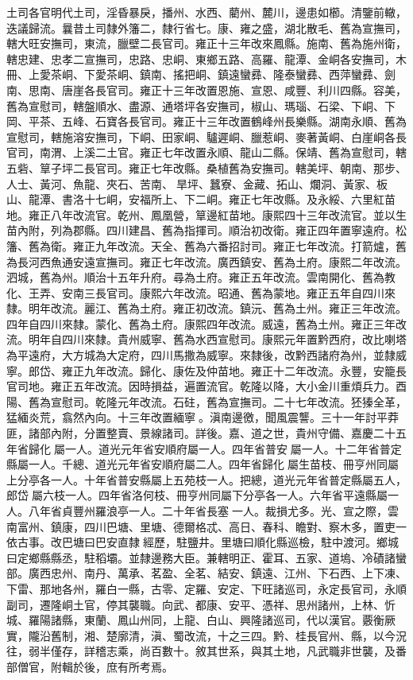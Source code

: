 \begin{pinyinscope}
土司各官明代土司，淫昏暴戾，播州、水西、藺州、麓川，邊患如櫛。清鑒前轍，迭議歸流。曩昔土司隸外籓二，隸行省七。康、雍之盛，湖北散毛、舊為宣撫司，轄大旺安撫司，東流，臘壁二長官司。雍正十三年改來鳳縣。施南、舊為施州衛，轄忠建、忠孝二宣撫司，忠路、忠峒、東鄉五路、高羅、龍潭、金峒各安撫司，木冊、上愛茶峒、下愛茶峒、鎮南、搖把峒、鎮遠蠻彞、隆泰蠻彞、西萍蠻彞、劍南、思南、唐崖各長官司。雍正十三年改置恩施、宣恩、咸豐、利川四縣。容美，舊為宣慰司，轄盤順水、盡源、通塔坪各安撫司，椒山、瑪瑙、石梁、下峒、下岡、平茶、五峰、石寶各長官司。雍正十三年改置鶴峰州長樂縣。湖南永順、舊為宣慰司，轄施溶安撫司，下峒、田家峒、驢遲峒、臘惹峒、麥著黃峒、白崖峒各長官司，南渭、上溪二土官。雍正七年改置永順、龍山二縣。保靖、舊為宣慰司，轄五砦、筸子坪二長官司。雍正七年改縣。桑植舊為安撫司。轄美坪、朝南、那步、人士、黃河、魚龍、夾石、苦南、旱坪、蠶寮、金藏、拓山、爛洞、黃家、板山、龍潭、書洛十七峒，安福所上、下二峒。雍正七年改縣。及永綏、六里紅苗地。雍正八年改流官。乾州、鳳凰營，筸邊紅苗地。康熙四十三年改流官。並以生苗內附，列為郡縣。四川建昌、舊為指揮司。順治初改衛。雍正四年置寧遠府。松籓、舊為衛。雍正九年改流。天全、舊為六番招討司。雍正七年改流。打箭爐，舊為長河西魚通安遠宣撫司。雍正七年改流。廣西鎮安、舊為土府。康熙二年改流。泗城，舊為州。順治十五年升府。尋為土府。雍正五年改流。雲南開化、舊為教化、王弄、安南三長官司。康熙六年改流。昭通、舊為蒙地。雍正五年自四川來隸。明年改流。麗江、舊為土府。雍正初改流。鎮沅、舊為土州。雍正三年改流。四年自四川來隸。蒙化、舊為土府。康熙四年改流。威遠，舊為土州。雍正三年改流。明年自四川來隸。貴州威寧、舊為水西宣慰司。康熙元年置黔西府，改比喇塔為平遠府，大方城為大定府，四川馬撒為威寧。來隸後，改黔西諸府為州，並隸威寧。郎岱、雍正九年改流。歸化、康佐及仲苗地。雍正十二年改流。永豐，安籠長官司地。雍正五年改流。因時損益，遍置流官。乾隆以降，大小金川重煩兵力。酉陽、舊為宣慰司。乾隆元年改流。石砫，舊為宣撫司。二十七年改流。狉獉全革，猛緬炎荒，翕然內向。十三年改置緬寧。滇南邊徼，聞風震讋。三十一年討平莽匪，諸部內附，分置整賣、景線諸司。詳後。嘉、道之世，貴州守備、嘉慶二十五年省歸化屬一人。道光元年省安順府屬一人。四年省普安屬一人。十二年省普定縣屬一人。千總、道光元年省安順府屬二人。四年省歸化屬生苗枝、冊亨州同屬上分亭各一人。十年省普安縣屬上五苑枝一人。把總，道光元年省普定縣屬五人，郎岱屬六枝一人。四年省洛何枝、冊亨州同屬下分亭各一人。六年省平遠縣屬一人。八年省貞豐州羅浪亭一人。二十年省長塞一人。裁損尤多。光、宣之際，雲南富州、鎮康，四川巴塘、里塘、德爾格忒、高日、春科、瞻對、察木多，置吏一依古事。改巴塘曰巴安直隸經歷，駐鹽井。里塘曰順化縣巡檢，駐中渡河。鄉城曰定鄉縣縣丞，駐稻壩。並隸邊務大臣。兼轄明正、霍耳、五家、道塢、冷磧諸蠻部。廣西忠州、南丹、萬承、茗盈、全茗、結安、鎮遠、江州、下石西、上下凍、下雷、那地各州，羅白一縣，古零、定羅、安定、下旺諸巡司，永定長官司，永順副司，遷隆峒土官，停其襲職。向武、都康、安平、憑祥、思州諸州，上林、忻城、羅陽諸縣，東蘭、鳳山州同，上龍、白山、興隆諸巡司，代以漢官。覈衡厥實，隴沿舊制，湘、楚廓清，滇、蜀改流，十之三四。黔、桂長官州、縣，以今況往，弱半僅存，詳稽志乘，尚百數十。敘其世系，與其土地，凡武職非世襲，及番部僧官，附輯於後，庶有所考焉。


\end{pinyinscope}
